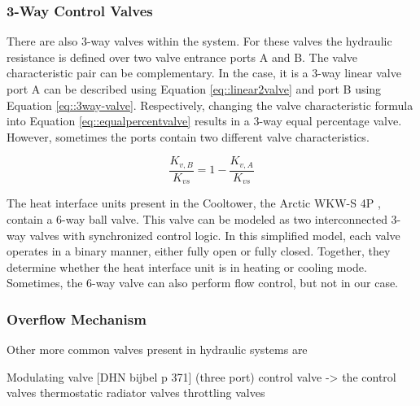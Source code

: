 \subsubsection{3-Way Control Valves}
There are also 3-way valves within the system. For these valves the hydraulic resistance is defined over two valve entrance ports A and B.
The valve characteristic pair can be complementary. In the case, it is a 3-way linear valve port A can be described using Equation \ref{eq::linear2valve} and port B using Equation \ref{eq::3way-valve}. Respectively, changing the valve characteristic formula into Equation \ref{eq::equalpercentvalve} results in a 3-way equal percentage valve. However, sometimes the ports contain two different valve characteristics. 

\begin{equation}\label{eq::3way-valve}
    \frac{K_{v,B}}{K_{vs}} = 1 - \frac{K_{v,A}}{K_{vs}}
\end{equation}

The heat interface units present in the Cooltower, the Arctic WKW-S 4P \cite{fortes_wkw_s_4p}, contain a 6-way ball valve. This valve can be modeled as two interconnected 3-way valves with synchronized control logic. In this simplified model, each valve operates in a binary manner, either fully open or fully closed. Together, they determine whether the heat interface unit is in heating or cooling mode. Sometimes, the 6-way valve can also perform flow control, but not in our case.

\subsubsection{Overflow Mechanism}

Other more common valves present in hydraulic systems are 

Modulating valve [DHN bijbel p 371]
(three port) control valve -> the control valves 
thermostatic radiator valves
throttling valves

